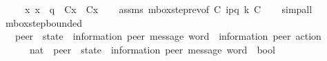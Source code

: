 \begin{isabellebody}
\ \ \ \ \ {\isachardoublequoteopen}{\isasymforall}x{\isachardot}{\kern0pt}\ x\ {\isasymnoteq}\ q\ {\isasymlongrightarrow}\ C{}{\isacharparenleft}{\kern0pt}x{\isacharparenright}{\kern0pt}\ {\isacharequal}{\kern0pt}\ C{}{\isacharparenleft}{\kern0pt}x{\isacharparenright}{\kern0pt}{\isachardoublequoteclose}\isanewline
%
\isadelimproof
\ \ %
\endisadelimproof
%
\isatagproof
{}\isamarkupfalse%
\ assms\ mbox{\isacharunderscore}{\kern0pt}step{\isacharunderscore}{\kern0pt}rev{\isacharbrackleft}{\kern0pt}of\ C{}\ {\isachardoublequoteopen}{\isacharquery}{\kern0pt}{\isasymlangle}{\isacharparenleft}{\kern0pt}i\isactrlbsup p{\isasymrightarrow}q\isactrlesup {\isacharparenright}{\kern0pt}{\isasymrangle}{\isachardoublequoteclose}\ k\ C{}{\isacharbrackright}{\kern0pt}\isanewline
\ \ \isamarkupfalse%
\ simp{\isacharunderscore}{\kern0pt}all%
\endisatagproof
{\isafoldproof}%
%
\isadelimproof
\isanewline
%
\endisadelimproof
\isanewline
{}\isamarkupfalse%
\ mbox{\isacharunderscore}{\kern0pt}step{\isacharunderscore}{\kern0pt}bounded\isanewline
\ \ {\isacharcolon}{\kern0pt}{\isacharcolon}{\kern0pt}\ {\isachardoublequoteopen}{\isacharparenleft}{\kern0pt}{\isacharprime}{\kern0pt}peer\ {\isasymRightarrow}\ {\isacharparenleft}{\kern0pt}{\isacharprime}{\kern0pt}state\ {\isasymtimes}\ {\isacharparenleft}{\kern0pt}{\isacharprime}{\kern0pt}information{\isacharcomma}{\kern0pt}\ {\isacharprime}{\kern0pt}peer{\isacharparenright}{\kern0pt}\ message\ word{\isacharparenright}{\kern0pt}{\isacharparenright}{\kern0pt}\ {\isasymRightarrow}\ {\isacharparenleft}{\kern0pt}{\isacharprime}{\kern0pt}information{\isacharcomma}{\kern0pt}\ {\isacharprime}{\kern0pt}peer{\isacharparenright}{\kern0pt}\ action\ {\isasymRightarrow}\isanewline
\ \ \ \ \ \ nat\ {\isasymRightarrow}\ {\isacharparenleft}{\kern0pt}{\isacharprime}{\kern0pt}peer\ {\isasymRightarrow}\ {\isacharparenleft}{\kern0pt}{\isacharprime}{\kern0pt}state\ {\isasymtimes}\ {\isacharparenleft}{\kern0pt}{\isacharprime}{\kern0pt}information{\isacharcomma}{\kern0pt}\ {\isacharprime}{\kern0pt}peer{\isacharparenright}{\kern0pt}\ message\ word{\isacharparenright}{\kern0pt}{\isacharparenright}{\kern0pt}\ {\isasymRightarrow}\ bool{\isachardoublequoteclose}\isanewline
\ \ \ \ \ {\isacharparenleft}{\kern0pt}{\isachardoublequoteopen}{\isacharunderscore}{\kern0pt}\ {\isasymmidarrow}{\isasymlangle}{\isacharunderscore}{\kern0pt}{\isacharcomma}{\kern0pt}\ {\isacharunderscore}{\kern0pt}{\isasymrangle}{\isasymrightarrow}\ {\isacharunderscore}{\kern0pt}{\isachardoublequoteclose}\ {\isacharbrackleft}{\kern0pt}{}{}{\isacharcomma}{\kern0pt}\ {}{}{\isacharcomma}{\kern0pt}\ {}{}{\isacharcomma}{\kern0pt}\ {}{}{\isacharbrackright}{\kern0pt}\ {}{}{}{\isacharparenright}{\kern0pt}\ \isanewline

\end{isabellebody}
